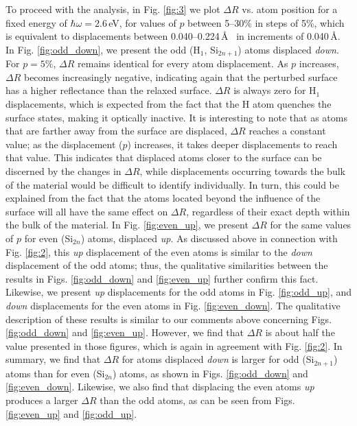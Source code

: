 \documentclass[pss]{wiley2sp} %
\begin{document}
To proceed with the analysis, in Fig. \ref{fig:3} we plot $\Delta R$ vs. atom
position for a fixed energy of $\hbar\omega = 2.6$\,eV, for values of $p$
between 5--30\% in steps of 5\%, which is equivalent to displacements between
0.040--0.224\,\AA~ in increments of 0.040\,\AA. In Fig. \ref{fig:odd_down}, we
present the odd (H$_{1}$, Si$_{2n+1}$) atoms displaced \emph{down}. For $p =
5\%$, $\Delta R$ remains identical for every atom displacement. As $p$
increases, $\Delta R$ becomes increasingly negative, indicating again that the
perturbed surface has a higher reflectance than the relaxed surface. $\Delta R$
is always zero for H$_{1}$ displacements, which is expected from the fact that
the H atom quenches the surface states, making it optically inactive. It is
interesting to note that as atoms that are farther away from the surface are
displaced, $\Delta R$ reaches a constant value; as the displacement ($p$)
increases, it takes deeper displacements to reach that value. This indicates
that displaced atoms closer to the surface can be discerned by the changes in
$\Delta R$, while displacements occurring towards the bulk of the material would
be difficult to identify individually. In turn, this could be explained from the
fact that the atoms located beyond the influence of the surface will all have
the same effect on $\Delta R$, regardless of their exact depth within the bulk
of the material. In Fig. \ref{fig:even_up}, we present $\Delta R$ for the same
values of $p$ for even (Si$_{2n}$) atoms, displaced \emph{up}. As discussed
above in connection with Fig. \ref{fig:2}, this \emph{up} displacement of the
even atoms is similar to the \emph{down} displacement of the odd atoms; thus,
the qualitative similarities between the results in Figs. \ref{fig:odd_down} and
\ref{fig:even_up} further confirm this fact. Likewise, we present \emph{up}
displacements for the odd atoms in Fig. \ref{fig:odd_up}, and \emph{down}
displacements for the even atoms in Fig. \ref{fig:even_down}. The qualitative
description of these results is similar to our comments above concerning Figs.
\ref{fig:odd_down} and \ref{fig:even_up}. However, we find that $\Delta R$ is
about half the value presented in those figures, which is again in agreement
with Fig. \ref{fig:2}. In summary, we find that $\Delta R$ for atoms displaced
\emph{down} is larger for odd (Si$_{2n+1}$) atoms than for even (Si$_{2n}$)
atoms, as shown in Figs. \ref{fig:odd_down} and \ref{fig:even_down}. Likewise,
we also find that displacing the even atoms \emph{up} produces a larger $\Delta
R$ than the odd atoms, as can be seen from Figs. \ref{fig:even_up} and
\ref{fig:odd_up}.
\end{document}
